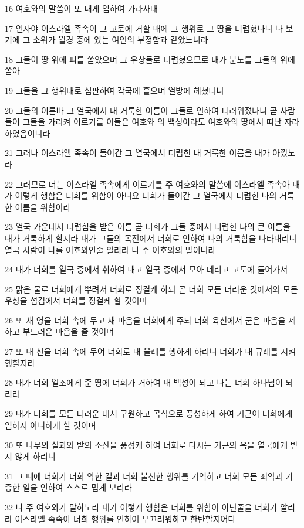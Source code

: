 \par 16 여호와의 말씀이 또 내게 임하여 가라사대
\par 17 인자야 이스라엘 족속이 그 고토에 거할 때에 그 행위로 그 땅을 더럽혔나니 나 보기에 그 소위가 월경 중에 있는 여인의 부정함과 같았느니라
\par 18 그들이 땅 위에 피를 쏟았으며 그 우상들로 더럽혔으므로 내가 분노를 그들의 위에 쏟아
\par 19 그들을 그 행위대로 심판하여 각국에 흩으며 열방에 헤쳤더니
\par 20 그들의 이른바 그 열국에서 내 거룩한 이름이 그들로 인하여 더러워졌나니 곧 사람들이 그들을 가리켜 이르기를 이들은 여호와 의 백성이라도 여호와의 땅에서 떠난 자라 하였음이니라
\par 21 그러나 이스라엘 족속이 들어간 그 열국에서 더럽힌 내 거룩한 이름을 내가 아꼈노라
\par 22 그러므로 너는 이스라엘 족속에게 이르기를 주 여호와의 말씀에 이스라엘 족속아 내가 이렇게 행함은 너희를 위함이 아니요 너희가 들어간 그 열국에서 더럽힌 나의 거룩한 이름을 위함이라
\par 23 열국 가운데서 더럽힘을 받은 이름 곧 너희가 그들 중에서 더럽힌 나의 큰 이름을 내가 거룩하게 할지라 내가 그들의 목전에서 너희로 인하여 나의 거룩함을 나타내리니 열국 사람이 나를 여호와인줄 알리라 나 주 여호와의 말이니라
\par 24 내가 너희를 열국 중에서 취하여 내고 열국 중에서 모아 데리고 고토에 들어가서
\par 25 맑은 물로 너희에게 뿌려서 너희로 정결케 하되 곧 너희 모든 더러운 것에서와 모든 우상을 섬김에서 너희를 정결케 할 것이며
\par 26 또 새 영을 너희 속에 두고 새 마음을 너희에게 주되 너희 육신에서 굳은 마음을 제하고 부드러운 마음을 줄 것이며
\par 27 또 내 신을 너희 속에 두어 너희로 내 율례를 행하게 하리니 너희가 내 규례를 지켜 행할지라
\par 28 내가 너희 열조에게 준 땅에 너희가 거하여 내 백성이 되고 나는 너희 하나님이 되리라
\par 29 내가 너희를 모든 더러운 데서 구원하고 곡식으로 풍성하게 하여 기근이 너희에게 임하지 아니하게 할 것이며
\par 30 또 나무의 실과와 밭의 소산을 풍성케 하여 너희로 다시는 기근의 욕을 열국에게 받지 않게 하리니
\par 31 그 때에 너희가 너희 악한 길과 너희 불선한 행위를 기억하고 너희 모든 죄악과 가증한 일을 인하여 스스로 밉게 보리라
\par 32 나 주 여호와가 말하노라 내가 이렇게 행함은 너희를 위함이 아닌줄을 너희가 알리라 이스라엘 족속아 너희 행위를 인하여 부끄러워하고 한탄할지어다
